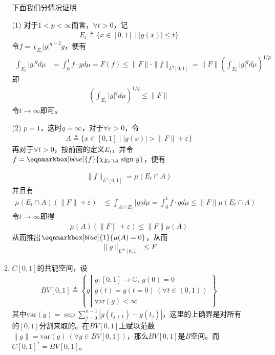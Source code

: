 \begin{enumerate}[leftmargin=2cm, label=\arabic*]
\begin{enumerate}[leftmargin=1cm, label=(\arabic*)]
			下面我们分情况证明
			
			(1) 对于$1<p<\infty$而言，$\forall t>0$，记
			\begin{align*}
				E_t \triangleq \{x\in[0,1]\mid |g(x)| \leqslant t\}
			\end{align*}
			令$f = \chi_{E_t}|g|^{q-2}g$，便有
			\begin{align*}
				\int_{E_t}|g|^q d\mu &= \int_0^1 f\cdot gd\mu = F(f) \leqslant \|F\|\cdot \|f\|_{L^q[0,1]} = \|F\|(\int_{E_t} |g|^q d\mu)^{1/p}
			\end{align*}
			即
			\begin{align*}
				(\int_{E_t}|g|^q d\mu)^{1/q} \leqslant \|F\|
			\end{align*}
			令$t\to\infty$即可。
			
			(2) $p =1$，这时$q=\infty$，对于$\forall \varepsilon > 0$，令
			\begin{align*}
				A\triangleq \{x\in[0,1]\mid |g(x)| >\|F\| + \varepsilon\}
			\end{align*}
			再对于$\forall t>0$，按前面的定义$E_t$，并令$f = \eqnmarkbox[blue]{f}{\chi_{E_t\cap A}\ \text{sign}\ g}$，便有
			
			\begin{align*}
				\|f\|_{L^1[0,1]} = \mu(E_t\cap A)
			\end{align*}
			并且有
			\begin{align*}
				\mu(E_t\cap A)(\|F\|+\varepsilon) &\leqslant \int_{A\cap E_t} |g| d\mu = \int_0^1 f\cdot gd\mu \leqslant \|F\| \mu(E_t\cap A)
			\end{align*}
			令$t\to\infty$即得
			\begin{align*}
				\mu(A)(\|F\| + \varepsilon) \leqslant \|F\| \mu(A)
			\end{align*}
			从而推出$\eqnmarkbox[blue]{1}{\mu(A)=0}$，从而
			\begin{align*}
				\|g\|_{L^{\infty}[0,1]} \leqslant F
			\end{align*}
			
			\item $C[0,1]$的共轭空间，设
			\begin{align*}
				BV[0,1] \triangleq \left\lbrace g\left|\begin{array}{l}
					g:[0,1]\to\mathbb{C},\ g(0) = 0 \\
					g(t) = g(t=0)\ (\forall t\in(0,1)) \\
					\text{var}(g) < \infty
				\end{array}  \right.\right\rbrace
			\end{align*}
			其中$\text{var}(g) = \sup\sum\limits_{j=0}^{n-1}|g(t_{j+1}) - g(t_j)|$，这里的上确界是对所有的$[0,1]$分割来取的。在$BV[0,1]$上赋以范数$\|g\| = \text{var}(g)\ (\forall g\in BV[0,1])$，那么$BV[0,1]$是$B$空间。而$C[0,1]^* = BV[0,1]$。
		\end{enumerate}
		

\end{enumerate}
